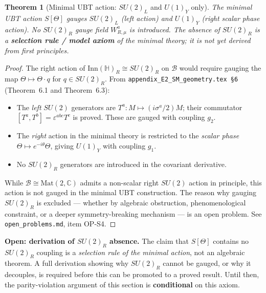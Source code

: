 \documentclass[12pt,a4paper]{article}
\newtheorem{theorem}{Theorem}[section]
\theoremstyle{definition}
\theoremstyle{remark}
\begin{document}
\begin{theorem}[Minimal UBT action: $SU(2)_L$ and $U(1)_Y$ only]
\label{thm:no_WR}
The \emph{minimal} UBT action $S[\Theta]$ gauges $SU(2)_L$ (left action)
and $U(1)_Y$ (right scalar phase action).  No $SU(2)_R$ gauge field
$W^a_{R,\mu}$ is introduced.  The absence of $SU(2)_R$ is a
\textbf{selection rule / model axiom} of the minimal theory; it is not
yet derived from first principles.
\end{theorem}

\begin{proof}
The right action of $\mathrm{Inn}(\mathbb{H})_R \cong SU(2)_R$ on
$\mathcal{B}$ would require gauging the map $\Theta \mapsto \Theta\cdot q$
for $q\in SU(2)_R$.  From \texttt{appendix\_E2\_SM\_geometry.tex~§6}
(Theorem~6.1 and Theorem~6.3):
\begin{itemize}
  \item The \emph{left} $SU(2)$ generators are $T^a: M\mapsto (i\sigma^a/2)M$;
        their commutator $[T^a, T^b] = \varepsilon^{abc}T^c$ is proved.
        These are gauged with coupling $g_2$.
  \item The \emph{right} action in the minimal theory is restricted to the
        \emph{scalar phase} $\Theta \mapsto e^{-i\theta}\Theta$,
        giving $U(1)_Y$ with coupling $g_1$.
  \item No $SU(2)_R$ generators are introduced in the covariant derivative.
\end{itemize}
While $\mathcal{B} \cong \mathrm{Mat}(2,\mathbb{C})$ admits a non-scalar
right $SU(2)$ action in principle, this action is not gauged in the
minimal UBT construction.  The reason why gauging $SU(2)_R$ is excluded
--- whether by algebraic obstruction, phenomenological constraint, or
a deeper symmetry-breaking mechanism --- is an open problem.
See \texttt{open\_problems.md}, item OP-S4.
\end{proof}

\begin{gapbox}
\textbf{Open: derivation of $SU(2)_R$ absence.}
The claim that $S[\Theta]$ contains no $SU(2)_R$ coupling is a
\emph{selection rule of the minimal action}, not an algebraic theorem.
A full derivation showing why $SU(2)_R$ cannot be gauged, or why it
decouples, is required before this can be promoted to a proved result.
Until then, the parity-violation argument of this section is
\textbf{conditional} on this axiom.
\end{gapbox}

\end{document}
